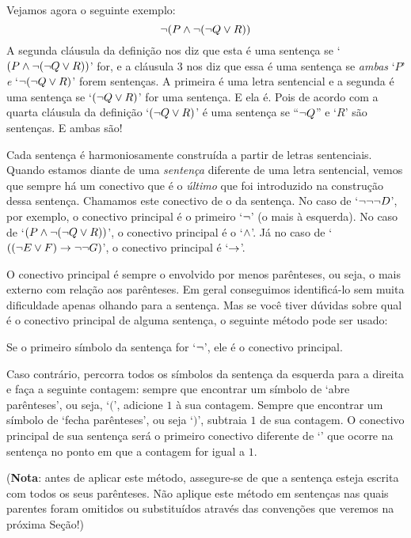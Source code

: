 Vejamos agora o seguinte exemplo:
$$\neg (P \wedge \neg (\neg Q \vee R))$$
A segunda cláusula da definição nos diz que esta é uma sentença se `$(P \wedge \neg (\neg Q \vee R))$' for, e a cláusula 3 nos diz que essa é uma sentença se \emph{ambas} `$P$' \emph{e} `$\neg (\neg Q \vee R)$' forem sentenças.
A primeira é uma letra sentencial e a segunda é uma sentença se `$(\neg Q \vee R)$' for uma sentença.
E ela é.
Pois de acordo com a quarta cláusula da definição `$(\neg Q \vee R)$' é uma sentença se ``$\neg Q$'' e `$R$' são sentenças. E ambas são!

Cada sentença é harmoniosamente construída a partir de letras sentenciais.
Quando estamos diante de uma \emph{sentença} diferente de uma letra sentencial, vemos que sempre há um conectivo que é o \emph{último} que foi introduzido na construção dessa sentença.
Chamamos este conectivo de o  da sentença.
No caso de `$\neg\neg\neg D$', por exemplo, o conectivo principal é o primeiro `$\neg$' (o mais à esquerda).
No caso de `$(P \wedge \neg (\neg Q \vee R))$', o conectivo principal é o `$\wedge$'.
Já no caso de `$((\neg E \vee F) \rightarrow \neg\neg G)$', o conectivo principal  é `$\rightarrow$'.

O conectivo principal é sempre o envolvido por menos parênteses, ou seja, o mais externo com relação aos parênteses.
Em geral conseguimos identificá-lo sem muita dificuldade apenas olhando para a sentença.
Mas se você tiver dúvidas sobre qual é o conectivo principal de alguma sentença, o seguinte método pode ser usado:
\begin{ebullet}
	\item Se o primeiro símbolo da sentença for `$\neg$', ele é o conectivo principal.
	\item  Caso contrário, percorra todos os símbolos da sentença da esquerda para a direita e faça a seguinte contagem: sempre que encontrar um símbolo de `abre parênteses', ou seja, `$($', adicione $1$ à sua contagem. Sempre que encontrar um símbolo de `fecha parênteses', ou seja `$)$', subtraia $1$ de sua contagem. O conectivo principal de sua sentença será o primeiro conectivo diferente de `\enot' que ocorre na sentença no ponto em que a contagem for igual a $1$.
\end{ebullet}

\noindent (\textbf{Nota}: antes de aplicar este método, assegure-se de que a sentença esteja escrita com todos os seus parênteses.
Não aplique este método em sentenças nas quais parentes foram omitidos ou substituídos através das convenções que veremos na próxima Seção!)

